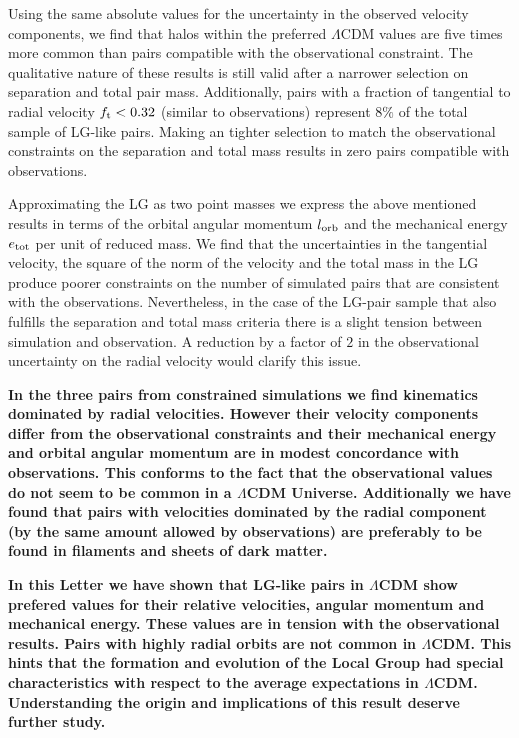 \documentclass{emulateapj}
\begin{document}
Using the same absolute values for the uncertainty in the observed velocity components, we find that halos within the preferred $\Lambda$CDM values are five times more common than pairs compatible with the observational constraint.  The qualitative nature of these results is still valid after a narrower selection on separation and total pair mass. Additionally, pairs with a fraction of tangential to radial velocity $f_{\rm t}<0.32$ (similar to observations) represent $8\%$ of the total sample of LG-like pairs. Making an tighter selection to match the observational constraints on the separation and total mass results in zero pairs compatible with observations.


Approximating the LG as two point masses we express the above mentioned results in terms of the orbital angular momentum $l_{\rm orb}$ and the mechanical energy $e_{\rm tot}$ per unit of reduced mass. We find that the uncertainties in the tangential velocity, the square of the norm of the velocity and the total mass in the LG produce poorer constraints on the number of simulated pairs that are consistent with the observations. Nevertheless, in the case of the LG-pair sample that also fulfills the separation and total mass criteria there is a slight tension between simulation and observation. A reduction by a factor of $2$ in the observational uncertainty on the radial velocity would clarify this issue.

{\bf In the three pairs from constrained simulations we find kinematics dominated by radial velocities. However their velocity components differ from the observational constraints and their mechanical energy and orbital angular momentum are in modest concordance with observations. This conforms to the fact that the observational values do not seem to be common in a $\Lambda$CDM Universe. Additionally we have found that pairs with velocities dominated by the radial component (by the same amount allowed by observations) are preferably to be found in filaments and sheets of dark matter. }

{\bf In this Letter we have shown that LG-like pairs in $\Lambda$CDM show prefered values for their relative velocities, angular momentum and mechanical energy. These values are in tension with the observational results. Pairs with highly radial orbits are not common in $\Lambda$CDM. This hints that the formation and evolution of the Local Group had special characteristics with respect to the average expectations in $\Lambda$CDM. Understanding the origin and implications of this result deserve further study.}
\end{document}
